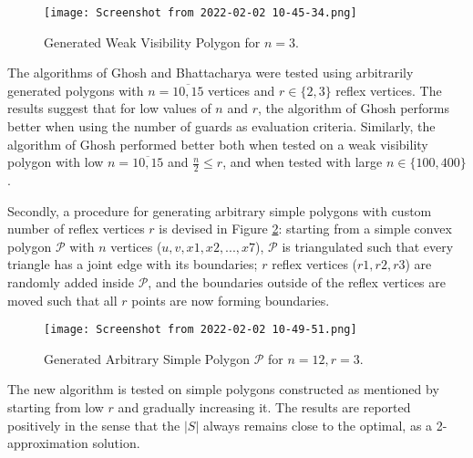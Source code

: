 \begin{figure}[h!]
    \centering
    \texttt{[image: Screenshot from 2022-02-02 10-45-34.png]}
    \caption{Generated Weak Visibility Polygon for $n = 3$.}
    \label{fig:weak}
\end{figure}

The algorithms of Ghosh \cite{GHOSH2010718} and Bhattacharya \cite{bhattacharya2016approximability} were tested using arbitrarily generated polygons with $n = \overline{10, 15}$ vertices and $r \in \{2, 3\}$ reflex vertices. The results suggest that for low values of $n$ and $r$, the algorithm of Ghosh \cite{GHOSH2010718} performs better when using the number of guards as evaluation criteria. 
Similarly, the algorithm of Ghosh \cite{GHOSH2010718} performed better both when tested on a weak visibility polygon with low $n = \overline{10, 15}$ and $\frac n 2 \leq r$, and when tested with large $n \in \{100, 400\}$.

Secondly, a procedure for generating arbitrary simple polygons with custom number of reflex vertices $r$ is devised in Figure \ref{fig:arbitrary}: starting from a simple convex polygon $\mathcal P$ with $n$ vertices ($u, v, x1, x2, ..., x7$), $\mathcal P$ is triangulated such that every triangle has a joint edge with its boundaries; $r$ reflex vertices ($r1, r2, r3$) are randomly added inside $\mathcal P$, and the boundaries outside of the reflex vertices are moved such that all $r$ points are now forming boundaries. 

\begin{figure}[h!]
    \centering
    \texttt{[image: Screenshot from 2022-02-02 10-49-51.png]}
    \caption{Generated Arbitrary Simple Polygon $\mathcal P$ for $n = 12, r = 3$.}
    \label{fig:arbitrary}
\end{figure}

The new algorithm is tested on simple polygons constructed as mentioned by starting from low $r$ and gradually increasing it. The results are reported positively in the sense that the $|S|$ always remains close to the optimal, as a 2-approximation solution.

